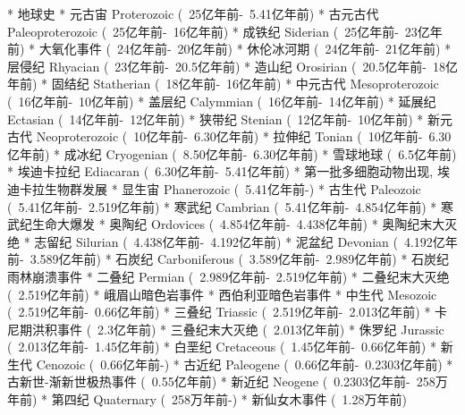 
* 地球史
	* 元古宙 Proterozoic	(~25亿年前-~5.41亿年前)
		* 古元古代 Paleoproterozoic	(~25亿年前-~16亿年前)
			* 成铁纪 Siderian	(~25亿年前-~23亿年前)
				* 大氧化事件	(~24亿年前-~20亿年前)
				* 休伦冰河期	(~24亿年前-~21亿年前)
			* 层侵纪 Rhyacian	(~23亿年前-~20.5亿年前)
			* 造山纪 Orosirian	(~20.5亿年前-~18亿年前)
			* 固结纪 Statherian	(~18亿年前-~16亿年前)
		* 中元古代 Mesoproterozoic	(~16亿年前-~10亿年前)
			* 盖层纪 Calymmian	(~16亿年前-~14亿年前)
			* 延展纪 Ectasian	(~14亿年前-~12亿年前)
			* 狭带纪 Stenian	(~12亿年前-~10亿年前)
		* 新元古代 Neoproterozoic	(~10亿年前-~6.30亿年前)
			* 拉伸纪 Tonian	(~10亿年前-~6.30亿年前)
			* 成冰纪 Cryogenian	(~8.50亿年前-~6.30亿年前)
				* 雪球地球	(~6.5亿年前)
			* 埃迪卡拉纪 Ediacaran (~6.30亿年前-~5.41亿年前)
				* 第一批多细胞动物出现, 埃迪卡拉生物群发展
	* 显生宙 Phanerozoic	(~5.41亿年前-)
		* 古生代 Paleozoic	(~5.41亿年前-~2.519亿年前)
			* 寒武纪 Cambrian	(~5.41亿年前-~4.854亿年前)
				* 寒武纪生命大爆发
			* 奥陶纪 Ordovices	(~4.854亿年前-~4.438亿年前)
				* 奥陶纪末大灭绝
			* 志留纪 Silurian	(~4.438亿年前-~4.192亿年前)
			* 泥盆纪 Devonian	(~4.192亿年前-~3.589亿年前)
			* 石炭纪 Carboniferous	(~3.589亿年前-~2.989亿年前)
				* 石炭纪雨林崩溃事件
			* 二叠纪 Permian	(~2.989亿年前-~2.519亿年前)
				* 二叠纪末大灭绝	(~2.519亿年前)
					* 峨眉山暗色岩事件
					* 西伯利亚暗色岩事件
		* 中生代 Mesozoic	(~2.519亿年前-~0.66亿年前)
			* 三叠纪 Triassic	(~2.519亿年前-~2.013亿年前)
				* 卡尼期洪积事件	(~2.3亿年前)
				* 三叠纪末大灭绝	(~2.013亿年前)
			* 侏罗纪 Jurassic	(~2.013亿年前-~1.45亿年前)
			* 白垩纪 Cretaceous	(~1.45亿年前-~0.66亿年前)
		* 新生代 Cenozoic	(~0.66亿年前-)
			* 古近纪 Paleogene	(~0.66亿年前-~0.2303亿年前)
				* 古新世-渐新世极热事件	(~0.55亿年前)
			* 新近纪 Neogene	(~0.2303亿年前-~258万年前)
			* 第四纪 Quaternary	(~258万年前-)
				* 新仙女木事件	(~1.28万年前)



